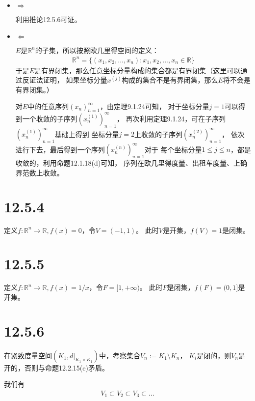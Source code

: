 \documentclass{article}
\begin{document}
\begin{itemize}
  \item $\Rightarrow$

        利用推论12.5.6可证。

  \item $\Leftarrow$

        $E$是$\mathbb{R}^n$的子集，所以按照欧几里得空间的定义：
        \begin{align*}
          \mathbb{R}^n = \{(x_1,x_2,...,x_n): x_1,x_2,...,x_n \in \mathbb{R}\}
        \end{align*}
        于是$E$是有界闭集，那么任意坐标分量构成的集合都是有界闭集（这里可以通过反证法证明，
        如果坐标分量$x^{(j)}$构成的集合不是有界闭集，那么$E$将不会是有界闭集。）

        对$E$中的任意序列$(x_n)_{n = 1}^\infty$，由定理9.1.24可知，
        对于坐标分量$j = 1$可以得到一个收敛的子序列$(x_n^{(1)})_{n = 1}^\infty$，
        再次利用定理9.1.24，可在子序列$(x_n^{(1)})_{n = 1}^\infty$基础上得到
        坐标分量$j=2$上收敛的子序列$(x_n^{(2)})_{n = 1}^\infty$，
        依次进行下去，最后得到一个序列$(x_n^{(n)})_{n = 1}^\infty$对于
        每个坐标分量$1 \leq j \leq n$，都是收敛的，利用命题12.1.18(d)可知，
        序列在欧几里得度量、出租车度量、上确界范数上收敛。
\end{itemize}

\section*{12.5.4}

定义$f: \mathbb{R}^n \rightarrow \mathbb{R}, f(x) = 0$，令$V = (-1, 1)$。
此时$V$是开集，$f(V) = {1}$是闭集。

\section*{12.5.5}

定义$f: \mathbb{R}^n \rightarrow \mathbb{R}, f(x) = 1/x$，令$F = [1, +\infty)$。
此时$F$是闭集，$f(F) = (0, 1]$是开集。

\section*{12.5.6}

在紧致度量空间$(K_1, d|_{K_1 \times K_1})$中，考察集合$V_n := K_1 \setminus K_n$，
$K_i$是闭的，则$V_n$是开的，否则与命题12.2.15(e)矛盾。

我们有
\begin{align*}
  V_1 \subset V_2 \subset V_3 \subset ...
\end{align*}
\end{document}
